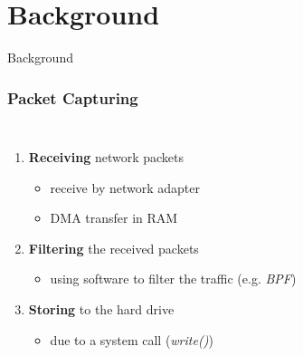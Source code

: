 \documentclass{beamer}
\begin{document}
\section{Background}
\begin{frame}
	\begin{center}
	\huge{Background}
	\end{center}
\end{frame}

\begin{frame}
\frametitle{Packet Capturing}
\begin{columns}
\vspace{-15em}
\begin{enumerate}
	\item \textbf{Receiving} network packets
		\begin{itemize}
			\item receive by network adapter
			\item DMA transfer in RAM \newline
		\end{itemize}
	\item \textbf{Filtering} the received packets 
		\begin{itemize}
			\item using software to filter the traffic (e.g. \emph{BPF})\newline
		\end{itemize}
	\item \textbf{Storing} to the hard drive
		\begin{itemize}
			\item due to a system call (\emph{write()})
		\end{itemize}
\end{enumerate}

\end{columns}
\end{frame}
\end{document}
